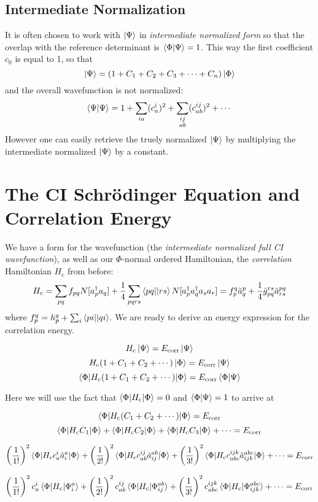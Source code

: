 \documentclass{article}
\newcommand{\lp}{\left(}
\newcommand{\rp}{\right)}
\newcommand{\Ecorr}{E_{\mathrm{corr}}}
\newcommand{\Hc}{H_{\mathrm{c}}}
\newcommand{\dg}{\ensuremath{^\dagger} }
\begin{document}
\subsection{Intermediate Normalization}
It is often chosen to work with $\ket{\Psi}$ in \textit{intermediate normalized form} so that the overlap with the reference determinant is $\braket{\Phi | \Psi} = 1$.  
This way the first coefficient $c_0$ is equal to 1, so that 
\[ \ket{\Psi} = \lp 1 + C_1 + C_2 + C_3 + \cdots + C_n \rp \ket{\Phi} \]
and the overall wavefunction is not normalized:
\[ \braket{\Psi|\Psi} = 1 + \sum_{ia} (c_a^i)^2 + \sum_{ \substack{ij \\ ab}} (c_{ab}^{ij})^2 + \cdots  \]
However one can easily retrieve the truely normalized $\ket{\Psi}$ by multiplying the intermediate normalized $\ket{\Psi}$ by a constant.


\section{The CI Schr{\"o}dinger Equation and Correlation Energy}
We have a form for the wavefunction (the \textit{intermediate normalized full CI wavefunction}), as well as our $\Phi$-normal ordered Hamiltonian, 
the \textit{correlation} Hamiltonian $\Hc$ from before:
\[\Hc =  \sum_{pq} f_{pq} N[a_p\dg a_q]  + \frac{1}{4} \sum_{pqrs} \braket{pq || rs} N[a_p\dg a_q\dg a_s a_r] = f_p^q \tilde{a}_q^p + \frac{1}{4} \bar{g}_{pq}^{rs} \tilde{a}_{rs}^{pq} \] 
where $f_{p}^{q} = h_{p}^{q} + \sum_i \braket{pi||qi} $.
We are ready to derive an energy expression for the correlation energy.

\[\Hc \ket{\Psi} = \Ecorr \ket{\Psi} \]
\[\Hc (1 + C_1 + C_2 + \cdots) \ket{\Phi} = \Ecorr \ket{\Psi} \]
\[\braket{\Phi | \Hc (1 + C_1 + C_2 + \cdots) | \Phi} = \Ecorr \braket{\Phi|\Psi} \]

Here we will use the fact that  $\braket{\Phi|\Hc|\Phi} = 0 $ and $\braket{\Phi|\Psi} = 1$ to arrive at

\[\braket{\Phi | \Hc (C_1 + C_2 + \cdots) | \Phi} = \Ecorr \]
\[ \braket{\Phi | \Hc C_1 | \Phi} + \braket{\Phi | \Hc C_2 | \Phi} + \braket{\Phi | \Hc C_3 | \Phi} + \cdots = \Ecorr \]

\[ \left(\frac{1}{1!}\right)^2 \braket{\Phi | \Hc c_a^i \tilde{a}_i^a  | \Phi}
+  \left(\frac{1}{2!}\right)^2 \braket{\Phi | \Hc c_{ab}^{ij} \tilde{a}_{ij}^{ab} | \Phi}
+  \left(\frac{1}{3!}\right)^2 \braket{\Phi | \Hc c_{abc}^{ijk} \tilde{a}_{ijk}^{abc} |\Phi} + \cdots = \Ecorr
\]

\[ \left(\frac{1}{1!}\right)^2 c_a^i \braket{\Phi | \Hc | \Phi_i^a}
+  \left(\frac{1}{2!}\right)^2 c_{ab}^{ij} \braket{\Phi | \Hc | \Phi_{ij}^{ab}}
+  \left(\frac{1}{3!}\right)^2 c_{abc}^{ijk} \braket{\Phi | \Hc |\Phi_{ijk}^{abc}} + \cdots = \Ecorr
\]
\end{document}
